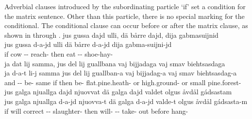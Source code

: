 Adverbial clauses introduced by the subordinating particle  ‘if’ set a condition for the matrix sentence. Other than this particle, there is no special marking for the conditional. 
The conditional clause can occur before or after the matrix clause, as shown in  through .%
\ea\label{conditionalClause1}%
\glll	jus gussa dajd ulli, dä bårre dajd, dija gabmasuijnid\\
	jus gussa d-a-jd ulli dä bårre d-a-jd dija gabma-suijni-jd\\
	if cow\BS{} -- reach- then eat\BS{} --  shoe-hay-\\\nopagebreak
{} 
\z
\ea\label{conditionalClause2}%
\glll	ja dat lij samma, jus del lij guallbana vaj bijjadaga vaj smav biehtsasdaga\\
	ja d-a-t li-j samma jus del lij guallban-a vaj bijjadag-a vaj smav biehtsasdag-a\\
	and -- be- same if then be- flat.pine.heath- or high.ground- or small pine.forest-\\\nopagebreak
{} 
\z
\ea\label{conditionalClause3}%
\glll	jus galga njuallga dajd njuovvat dä galga dajd valdet olgus åvdål gádsastam\\
	jus galga njuallga d-a-jd njuovva-t dä galga d-a-jd valde-t olgus åvdål gádsasta-m\\
	if will\BS{} correct -- slaughter- then will- -- take- out before hang-\\\nopagebreak
{} 
\z


